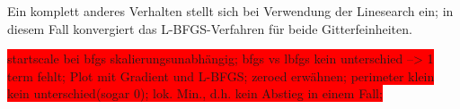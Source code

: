 \documentclass[bibliography=totoc,12pt,a4paper]{scrartcl}
\theoremstyle{exampstyle}
\numberwithin{equation}{section}
\begin{document}
Ein komplett anderes Verhalten stellt sich bei Verwendung der Linesearch ein; in diesem Fall konvergiert das L-BFGS-Verfahren für beide Gitterfeinheiten.

\colorbox{red}{startscale bei bfgs skalierungsunabhängig; bfgs vs lbfgs kein unterschied --> 1 term fehlt; Plot mit Gradient und L-BFGS; zeroed erwähnen; perimeter klein kein unterschied(sogar 0); lok. Min., d.h. kein Abstieg in einem Fall; }

\newpage
\nocite{*}


\end{document}
